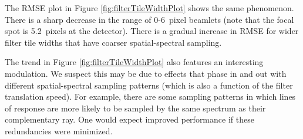 \documentclass[12pt]{spieman}  %
\begin{document}
\begin{spacing}{1}
The RMSE plot in Figure \ref{fig:filterTileWidthPlot} shows the same phenomenon. There is a sharp decrease in the range of 0-6~pixel beamlets (note that the focal spot is 5.2~pixels at the detector). There is a gradual increase in RMSE for wider filter tile widths that have coarser spatial-spectral sampling.

The trend in Figure \ref{fig:filterTileWidthPlot} also features an interesting modulation. We suspect this may be due to effects that phase in and out with different spatial-spectral sampling patterns (which is also a function of the filter translation speed). For example, there are some sampling patterns in which lines of response are more likely to be sampled by the same spectrum as their complementary ray. One would expect improved performance if these redundancies were minimized.

\vspace{4mm}









\FloatBarrier

\vspace{-4mm}


\end{spacing}
\end{document}
